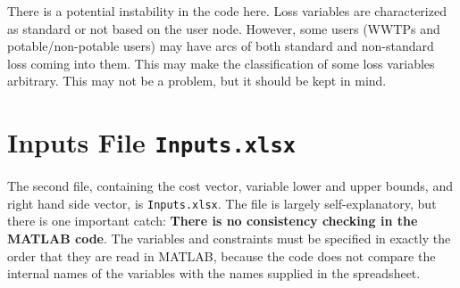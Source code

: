 \documentclass[11pt]{article}
\newcommand{\inputs}{\texttt{Inputs.xlsx}}
\begin{document}
There is a potential instability in the code here.
Loss variables are characterized as standard or not based on the user node.
However, some users (WWTPs and potable/non-potable users) may have arcs of both standard and non-standard loss coming into them.
This may make the classification of some loss variables arbitrary.
This may not be a problem, but it should be kept in mind.

\section{Inputs File \inputs}

The second file, containing the cost vector, variable lower and upper bounds, and right hand side vector, is \inputs.
The file is largely self-explanatory, but there is one important catch:
\textbf{There is no consistency checking in the MATLAB code}.
The variables and constraints must be specified in exactly the order that they are read in MATLAB, because the code does not compare the internal names of the variables with the names supplied in the spreadsheet.
\end{document}

